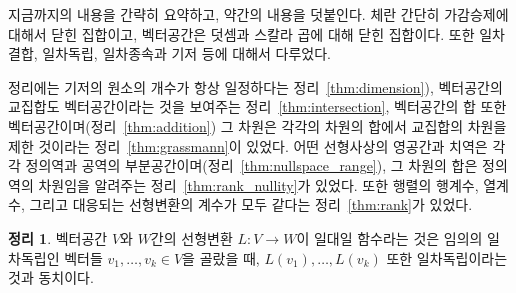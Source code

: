 \documentclass[unfonts,oneside,a4paper]{oblivoir}
\theoremstyle{definition}
\theoremstyle{theorem}
\newtheorem{theorem}{정리}[section]
\theoremstyle{theorem}
\theoremstyle{remark}
\theoremstyle{remark}
\theoremstyle{remark}
\theoremstyle{remark}
\renewcommand{\vec}[1]{\bm{\mathit{#1}}}
\begin{document}
지금까지의 내용을 간략히 요약하고, 약간의 내용을 덧붙인다.
체란 간단히 가감승제에 대해서 닫힌 집합이고, 벡터공간은 덧셈과 스칼라 곱에 대해 닫힌 집합이다.
또한 일차결합, 일차독립, 일차종속과 기저 등에 대해서 다루었다.

정리에는 기저의 원소의 개수가 항상 일정하다는 정리~\ref{thm:dimension}), 벡터공간의 교집합도 벡터공간이라는 것을 보여주는 정리~\ref{thm:intersection}, 벡터공간의 합 또한 벡터공간이며(정리~\ref{thm:addition}) 그 차원은 각각의 차원의 합에서 교집합의 차원을 제한 것이라는 정리~\ref{thm:grassmann}이 있었다.
어떤 선형사상의 영공간과 치역은 각각 정의역과 공역의 부분공간이며(정리~\ref{thm:nullspace_range}), 그 차원의 합은 정의역의 차원임을 알려주는 정리~\ref{thm:rank_nullity}가 있었다.
또한 행렬의 행계수, 열계수, 그리고 대응되는 선형변환의 계수가 모두 같다는 정리~\ref{thm:rank}가 있었다.

\begin{theorem} \label{thm:image_independence}
    벡터공간 $V$와 $W$간의 선형변환 $L: V \rightarrow W$이 일대일 함수라는 것은 임의의 일차독립인 벡터들 $\vec v_1, \dots, \vec v_k \in V$을 골랐을 때, $L(\vec v_1), \dots, L(\vec v_k)$ 또한 일차독립이라는 것과 동치이다.
\end{theorem}
\end{document}
